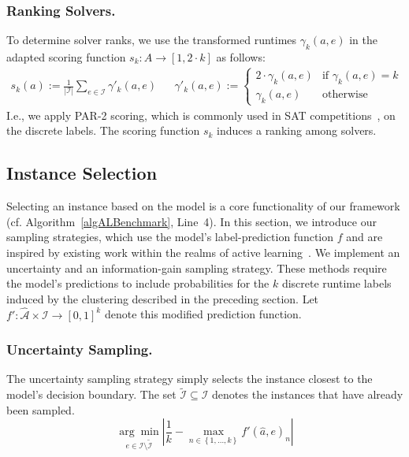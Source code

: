 \documentclass[runningheads]{llncs}
\begin{document}
\subsubsection{Ranking Solvers.}

To determine solver ranks, we use the transformed runtimes $\gamma_k(a, e)$ in the adapted scoring function $s_k : A \rightarrow [1, 2 \cdot k]$ as follows:
%
\begin{align}
  s_k(a) := \frac{1}{|\mathcal{I}|} \sum_{e \in \mathcal{I}} \gamma'_k(a, e)
  &&
  \gamma'_k(a, e) := \begin{cases}
    2 \cdot \gamma_k(a, e)   & \text{if } \gamma_k(a, e) = k\\
  \gamma_k(a, e)  & \text{otherwise}
  \end{cases}
  \label{eq:rankingeq}
\end{align}
%
I.e., we apply PAR-2 scoring, which is commonly used in SAT competitions~\cite{FroleyksHIJS21}, on the discrete labels.
The scoring function $s_k$ induces a ranking among solvers.


\subsection{Instance Selection}
\label{sec:main:selection}

Selecting an instance based on the model is a core functionality of our framework (cf. Algorithm~\ref{algALBenchmark}, Line~4).
In this section, we introduce our sampling strategies, which use the model's label-prediction function $f$ and are inspired by existing work within the realms of active learning~\cite{settles2009active}.
We implement an uncertainty and an information-gain sampling strategy.
These methods require the model's predictions to include probabilities for the $k$ discrete runtime labels induced by the clustering described in the preceding section.
Let \mbox{$f' : \mathcal{\hat A} \times \mathcal{I} \rightarrow \left[0, 1\right]^k$} denote this modified prediction function.

\subsubsection{Uncertainty Sampling.}

The uncertainty sampling strategy simply selects the instance closest to the model's decision boundary.
The set $\tilde{\mathcal{I}} \subseteq \mathcal{I}$ denotes the instances that have already been sampled.
%
\begin{equation*}
  \underset{e \in \mathcal{I} \setminus \tilde{\mathcal{I}}}{\arg\min} \left\lvert \frac{1}{k} - \max_{n \in \left\lbrace 1, \dots, k \right\rbrace} f'\!\left(\hat{a}, e\right)_{n} \right\rvert
\end{equation*}
\end{document}
